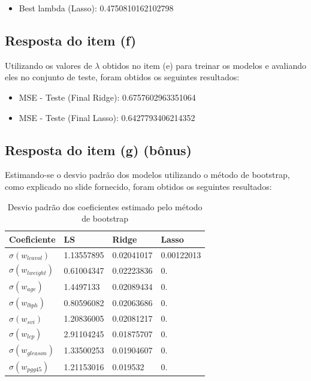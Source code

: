 \begin{itemize}
    \item Best lambda (Lasso): 0.4750810162102798
\end{itemize}

\subsection{Resposta do item (f)}
Utilizando os valores de $\lambda$ obtidos no item (e) para treinar os modelos e avaliando eles no conjunto de teste, foram obtidos os seguintes resultados:

\begin{itemize}
    \item MSE - Teste (Final Ridge): 0.6757602963351064
    \item MSE - Teste (Final Lasso): 0.6427793406214352
\end{itemize}

\subsection{Resposta do item (g) (bônus)}
Estimando-se o desvio padrão dos modelos utilizando o método de bootstrap, como explicado no slide fornecido, foram obtidos os seguintes resultados:

\begin{table}[H]
    \caption{Desvio padrão dos coeficientes estimado pelo método de bootstrap}
    \centering
        \begin{tabular}{|l|lll|}
            \toprule
            Coeficiente & LS & Ridge & Lasso \\
            \midrule
            $\sigma(w_{lcavol})$ & 1.13557895 & 0.02041017 & 0.00122013 \\
            $\sigma(w_{lweight})$ & 0.61004347 & 0.02223836 & 0. \\
            $\sigma(w_{age})$ & 1.4497133 & 0.02089434 & 0. \\
            $\sigma(w_{lbph})$ & 0.80596082 & 0.02063686 & 0. \\
            $\sigma(w_{svi})$ & 1.20836005 & 0.02081217 & 0. \\
            $\sigma(w_{lcp})$ & 2.91104245 & 0.01875707 & 0. \\
            $\sigma(w_{gleason})$ & 1.33500253 & 0.01904607 & 0. \\
            $\sigma(w_{pgg45})$ & 1.21153016 & 0.019532 & 0. \\
            \bottomrule
        \end{tabular}
\end{table}






